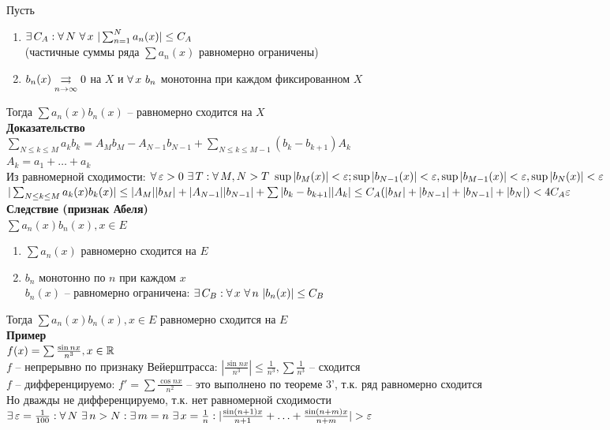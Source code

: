 \documentclass[12pt]{article}
\begin{document}
Пусть \begin{enumerate}
    \item $\ex C_A: \fall N \ \fall x\ |\sum_{n=1}^N a_n(x)|\leq C_A$\\
    (частичные суммы ряда $\sum a_n(x)$ равномерно ограничены)
    \item $b_n(x) \underset{n\rightarrow \infty} {\rightrightarrows} 0$ на $X$ и $\forall\, x\ b_n$ монотонна при каждом фиксированном $X$
\end{enumerate}
Тогда $\sum a_n(x)b_n(x)$ -- равномерно сходится на $X$\\
\textbf{Доказательство}\\
$\sum_{N \leq k \leq M} a_kb_k = A_Mb_M - A_{N-1}b_{N-1} + \sum_{N \leq k \leq M-1}(b_k-b_{k+1})A_k$\\
$A_k = a_1 + \ldots + a_k$\\
Из равномерной сходимости: $\fall \eps>0\ \ex T: \fall M,N > T\ \sup|b_M(x)|<\eps;\sup|b_{N-1}(x)|<\eps,\sup|b_{M-1}(x)|<\eps,\sup|b_N(x)|<\eps$\\
$|\sum_{N\leq k \leq M} a_k(x)b_k(x)| \leq |A_M||b_M|+|A_{N-1}||b_{N-1}| + \sum |b_k-b_{k+1}||A_k| \leq C_A(|b_M| + |b_{N-1}|+|b_{N-1}|+|b_N|) < 4C_A\varepsilon$\\
\textbf{Следствие (признак Абеля)}\\
$\sum a_n(x)b_n(x), x \in E$
\begin{enumerate}
    \item $\sum a_n(x)$ равномерно сходится на $E$
    \item $b_n$ монотонно по $n$ при каждом $x$\\
    $b_n(x)$ -- равномерно ограничена: $\ex C_B: \fall x\ \fall n\ |b_n(x)|\leq C_B$
\end{enumerate}
Тогда $\sum a_n(x)b_n(x), x \in E$ равномерно сходится на $E$\\
\textbf{Пример}\\
$f(x) = \sum \frac{\sin nx}{n^3}, x \in \mathbb{R}$\\
$f$ -- непрерывно по признаку Вейерштрасса: $|\frac{\sin nx}{n^3}| \leq \frac1{n^3}, \sum \frac1{n^3}$ -- сходится\\
$f$ -- дифференцируемо: $f' = \sum \frac{\cos nx}{n^2}$ -- это выполнено по теореме 3', т.к. ряд равномерно сходится\\
Но дважды не дифференцируемо, т.к. нет равномерной сходимости\\
$\exists\, \varepsilon=\frac1{100}: \forall\, N\ \exists\, n > N: \exists\, m=n\ \exists\, x=\frac1n: |\frac{\sin (n+1)x}{n+1} + \ldots + \frac{\sin (n+m)x}{n+m}| > \varepsilon$\\
\end{document}
